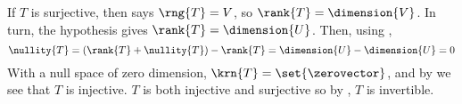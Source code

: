 If $T$ is surjective, then  says $\rng{T}=V$, so $\rank{T}=\dimension{V}$.  In turn, the hypothesis gives $\rank{T}=\dimension{U}$.  Then, using ,
%
\begin{equation*}
\nullity{T}=\left(\rank{T}+\nullity{T}\right)-\rank{T}=\dimension{U}-\dimension{U}=0
\end{equation*}
%
With a null space of zero dimension, $\krn{T}=\set{\zerovector}$, and by  we see that $T$ is injective.  $T$ is both injective and surjective so by , $T$ is invertible.
